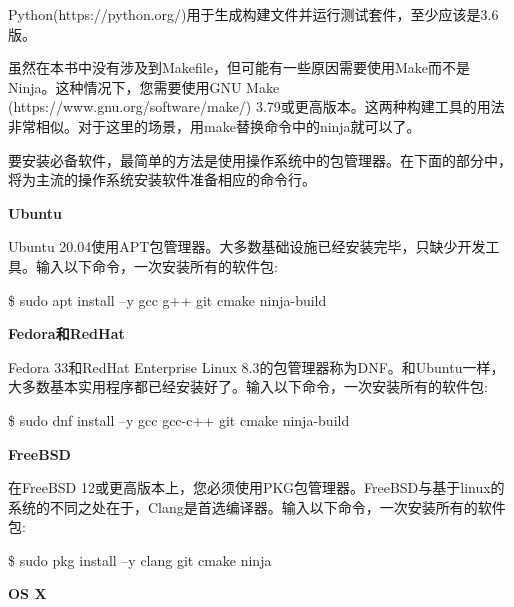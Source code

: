 Python(https://python.org/)用于生成构建文件并运行测试套件，至少应该是3.6版。\par

虽然在本书中没有涉及到Makefile，但可能有一些原因需要使用Make而不是Ninja。这种情况下，您需要使用GNU Make (https://www.gnu.org/software/make/) 3.79或更高版本。这两种构建工具的用法非常相似。对于这里的场景，用make替换命令中的ninja就可以了。\par

要安装必备软件，最简单的方法是使用操作系统中的包管理器。在下面的部分中，将为主流的操作系统安装软件准备相应的命令行。\par

\hspace*{\fill} \par %
\textbf{Ubuntu}

Ubuntu 20.04使用APT包管理器。大多数基础设施已经安装完毕，只缺少开发工具。输入以下命令，一次安装所有的软件包:\par

\begin{tcolorbox}[colback=white,colframe=black]
\$ sudo apt install –y gcc g++ git cmake ninja-build
\end{tcolorbox}

\hspace*{\fill} \par %
\textbf{Fedora和RedHat}

Fedora 33和RedHat Enterprise Linux 8.3的包管理器称为DNF。和Ubuntu一样，大多数基本实用程序都已经安装好了。输入以下命令，一次安装所有的软件包:\par

\begin{tcolorbox}[colback=white,colframe=black]
\$ sudo dnf install –y gcc gcc-c++ git cmake ninja-build
\end{tcolorbox}

\hspace*{\fill} \par %
\textbf{FreeBSD}

在FreeBSD 12或更高版本上，您必须使用PKG包管理器。FreeBSD与基于linux的系统的不同之处在于，Clang是首选编译器。输入以下命令，一次安装所有的软件包:\par

\begin{tcolorbox}[colback=white,colframe=black]
\$ sudo pkg install –y clang git cmake ninja
\end{tcolorbox}

\hspace*{\fill} \par %
\textbf{OS X}

